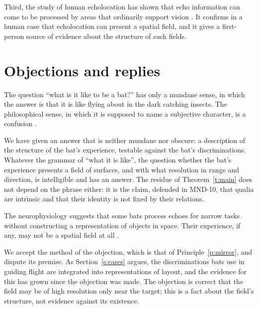 \documentclass{situationist-preprint}
\begin{document}
Third, the study of human echolocation has shown that echo information can come to be processed by areas that ordinarily support vision \citep{Thaler2011}. It confirms in a human case that echolocation can present a spatial field, and it gives a first-person source of evidence about the structure of such fields.

\section{Objections and replies}\label{s:objections}

\begin{objection}[Hacker]\label{o:hacker}
The question \enquote{what is it like to be a bat?} has only a mundane sense, in which the answer is that it is like flying about in the dark catching insects. The philosophical sense, in which it is supposed to name a subjective character, is a confusion \citep{Hacker2002}.
\end{objection}

\begin{reply}
We have given an answer that is neither mundane nor obscure: a description of the structure of the bat's experience, testable against the bat's discriminations. Whatever the grammar of \enquote{what it is like}, the question whether the bat's experience presents a field of surfaces, and with what resolution in range and direction, is intelligible and has an answer. The residue of Theorem~\ref{t:main} does not depend on the phrase either: it is the claim, defended in MND-10, that qualia are intrinsic and that their identity is not fixed by their relations.
\end{reply}

\begin{objection}[Akins]\label{o:akins}
The neurophysiology suggests that some bats process echoes for narrow tasks without constructing a representation of objects in space. Their experience, if any, may not be a spatial field at all \citep{Akins1993}.
\end{objection}

\begin{reply}
We accept the method of the objection, which is that of Principle~\ref{p:mirror}, and dispute its premise. As Section~\ref{s:cases} argues, the discriminations bats use in guiding flight are integrated into representations of layout, and the evidence for this has grown since the objection was made. The objection is correct that the field may be of high resolution only near the target; this is a fact about the field's structure, not evidence against its existence.
\end{reply}
\end{document}
